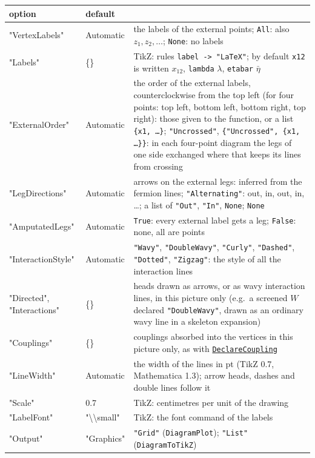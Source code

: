 \documentclass[11pt,a4paper]{article}
\newcommand{\pkg}[1]{\texttt{#1}}
\newcommand{\fnref}[1]{\hyperref[fn:#1]{\pkg{#1}}}
\begin{document}
\begin{center}
\small
\begin{tabularx}{\textwidth}{@{}>{\ttfamily\small}l>{\ttfamily\small}l>{\raggedright\arraybackslash}X@{}}
\toprule
\textrm{option} & \textrm{default} & \\
\midrule
"VertexLabels" & Automatic & the labels of the external points; \texttt{All}: also $z_1,z_2,\dots$; \texttt{None}: no labels\\
"Labels" & \{\} & TikZ: rules \pkg{label -> "LaTeX"}; by default \pkg{x12} is written $x_{12}$, \pkg{lambda} $\lambda$, \pkg{etabar}
  $\bar\eta$\\
"ExternalOrder" & Automatic & the order of the external labels, counterclockwise from the top left (for four points: top
  left, bottom left, bottom right, top right): those given to the function, or a list \pkg{\{x1, \dots\}};
  \texttt{"Uncrossed"}, \pkg{\{"Uncrossed", \{x1, \dots\}\}}: in each four-point diagram the legs of one side exchanged
  where that keeps its lines from crossing\\
"LegDirections" & Automatic & arrows on the external legs: inferred from the fermion lines; \texttt{"Alternating"}: out,
  in, out, in, \dots; a list of \texttt{"Out"}, \texttt{"In"}, \texttt{None}; \texttt{None}\\
"AmputatedLegs" & Automatic & \texttt{True}: every external label gets a leg; \texttt{False}: none, all are points\\
"InteractionStyle" & Automatic & \texttt{"Wavy"}, \texttt{"DoubleWavy"}, \texttt{"Curly"}, \texttt{"Dashed"},
  \texttt{"Dotted"}, \texttt{"Zigzag"}: the style of all the interaction lines\\
"Directed", "Interactions" & \{\} & heads drawn as arrows, or as wavy interaction lines, in this picture only (e.g.\ a
  screened $W$ declared \texttt{"DoubleWavy"}, drawn as an ordinary wavy line in a skeleton expansion)\\
"Couplings" & \{\} & couplings absorbed into the vertices in this picture only, as with \fnref{DeclareCoupling}\\
"LineWidth" & Automatic & the width of the lines in pt (TikZ 0.7, Mathematica 1.3); arrow heads, dashes and double lines
  follow it\\
"Scale" & 0.7 & TikZ: centimetres per unit of the drawing\\
"LabelFont" & "\textbackslash\textbackslash small" & TikZ: the font command of the labels\\
"Output" & "Graphics" & \texttt{"Grid"} (\pkg{DiagramPlot}); \texttt{"List"} (\pkg{DiagramToTikZ})\\

\end{tabularx}
\end{center}
\end{document}
